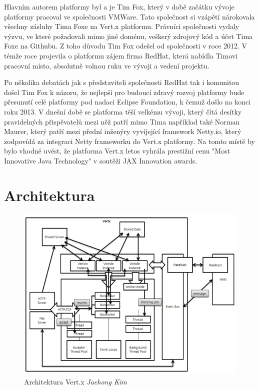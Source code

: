 Hlavním autorem platformy byl a je Tim Fox, který v době začátku vývoje platformy pracoval ve společnosti VMWare. Tato společnost si vzápětí nárokovala všechny zásluhy Tima Foxe na Vert.x platformu. Právníci společnosti vydaly výzvu, ve které požadovali mimo jiné doménu, veškerý zdrojový kód a účet Tima Foxe na Githubu. Z toho důvodu Tim Fox odešel od společnosti v roce 2012. V témže roce projevila o platformu zájem firma RedHat, která nabídla Timovi pracovní místo, absolutně volnou ruku ve vývoji a vedení projektu\citep{whoControlVertx}. 

Po několika debatách jak s představiteli společnosti RedHat tak i komunitou došel Tim Fox k názoru, že nejlepší pro budoucí zdravý rozvoj platformy bude přesunutí celé platformy pod nadaci Eclipse Foundation, k čemuž došlo na konci roku 2013. V dnešní době se platforma těší velkému vývoji, který čítá desítky  pravidelných přispěvatelů mezi něž patří mimo Tima například také Norman Maurer, který patří mezi přední inženýry vyvíjející framework Netty.io, který zodpovídá za integraci Netty frameworku do Vert.x platformy. Na tomto místě by bylo vhodné uvést, že platforma Vert.x letos vyhrála prestižní cenu "Most Innovative Java Technology" v soutěži JAX Innovation awards\citep{JAX}.

\section{Architektura}

\begin{figure}
\begin{centering}
\includegraphics[width=1\textwidth]{obrazky/vertx-architecture-diagram}
\par\end{centering}
\caption{Architektura Vert.x \emph{Jaehong Kim} \label{fig:vertxArchitectureDiagram}}
\end{figure}

